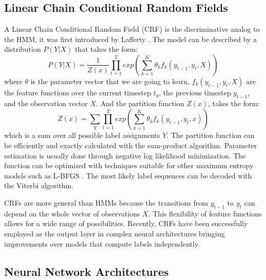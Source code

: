 \documentclass{nle}
\begin{document}
\subsection{Linear Chain Conditional Random Fields}

A Linear Chain Conditional Random Field (CRF) is the discriminative analog to the HMM,
it was first introduced by Lafferty \cite{Lafferty2001}. The model can be described by a 
distribution $ P(Y|X) $ that takes the form:
%
\begin{equation}
P(Y|X) = \frac{1}{Z(x)} \prod_{t=1}^{T} exp \left( \sum_{k=1}^{K} \theta_k f_k(y_{t-1}, y_t, X) \right)
\end{equation}
%
where $ \theta $ is the parameter vector that we are going to learn, $ f_k(y_{t-1}, y_{t}, X) $ 
are the feature functions over the current timestep $ t_y $, the previous timestep $ y_{t-1}$, 
and the observation vector $ X $. And the partition function $ Z(x) $, takes the form:
%
\begin{equation}
Z(x) = \sum_{Y} \prod_{t=1}^{T} exp \left( \sum_{k=1}^{K} \theta_k f_k(y_{t-1}, y_t, x) \right)
\end{equation}
%
which is a sum over all possible label assignments $ Y $. The partition function can be efficiently
and exactly calculated with the sum-product algorithm. Parameter estimation is usually done through 
negative log likelihood minimization. The function can be optimized with techniques suitable for other 
maximum entropy models such as L-BFGS \cite{Liu1989}. The most likely label sequences can be decoded 
with the Viterbi algorithm.

CRFs are more general than HMMs because the transitions from $ y_{t-1} $ to $ y_{t} $ can depend 
on the whole vector of observations $ X $. This flexibility of feature functions allows for a wide range of
possibilities. Recently, CRFs have been successfully employed as the output layer in complex neural 
architectures bringing improvements over models that compute labels independently.

\subsection{Neural Network Architectures}
\end{document}
